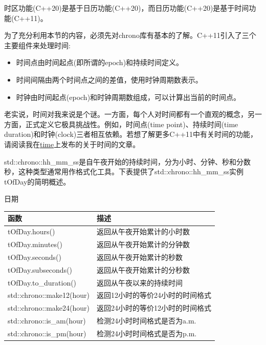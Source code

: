时区功能(C++20)是基于日历功能(C++20)，而日历功能(C++20)是基于时间功能(C++11)。


\begin{tcolorbox}[breakable,enhanced jigsaw,colback=blue!5!white,colframe=blue!75!black,title={C++11的时间库}]
	
为了充分利用本节的内容，必须先对chrono库有基本的了解。C++11引入了三个主要组件来处理时间:

\begin{itemize}
\item 
时间点由时间起点(即所谓的epoch)和持续时间定义。

\item 
时间间隔由两个时间点之间的差值，使用时钟周期数表示。

\item 
时钟由时间起点(epoch)和时钟周期数组成，可以计算出当前的时间点。
\end{itemize}

老实说，时间对我来说是个谜。一方面，每个人对时间都有一个直观的概念，另一方面，正式定义它极具挑战性。例如，时间点(time point)、持续时间(time duration)和时钟(clock)三者相互依赖。若想了解更多C++11中有关时间的功能，请阅读我在\href{https://www.modernescpp.com/index.php/tag/time}{time}上发布的关于时间的文章。
	
\end{tcolorbox}


std::chrono::hh\_mm\_ss是自午夜开始的持续时间，分为小时、分钟、秒和分数秒，这种类型通常用作格式化工具。下表提供了std::chrono::hh\_mm\_ss实例tOfDay的简明概述。

\begin{center}
日期
\end{center}

\begin{table}[H]
\centering
\begin{tabular}{ll}
\textbf{函数}         & \textbf{描述}                        \\ \hline
tOfDay.hours()            & 返回从午夜开始累计的小时数   \\
tOfDay.minutes()          & 返回从午夜开始累计的分钟数 \\
tOfDay.seconds()          & 返回从午夜开始累计的秒数 \\
tOfDay.subseconds()       & 返回从午夜开始累计的分秒数  \\
tOfDay.to\_duration()     & 返回从午夜以来的持续时间    \\
std::chrono::make12(hour) & 返回12小时的等价24小时的时间格式 \\
std::chrono::make24(hour) & 返回24小时的等价12小时的时间格式 \\
std::chrono::is\_am(hour) & 检测24小时时间格式是否为a.m.  \\
std::chrono::is\_pm(hour) & 检测24小时时间格式是否为p.m.
\end{tabular}
\end{table}


